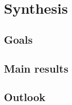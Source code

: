 	
\chapter{Synthesis}
\label{chap:synth}
\newpage


\section{Goals}
\label{sec:synth:goal}
\newpage



\section{Main results}
\label{sec:synth:mainres}
\newpage




\section{Outlook}
\label{sec:synth:outline}
\newpage














